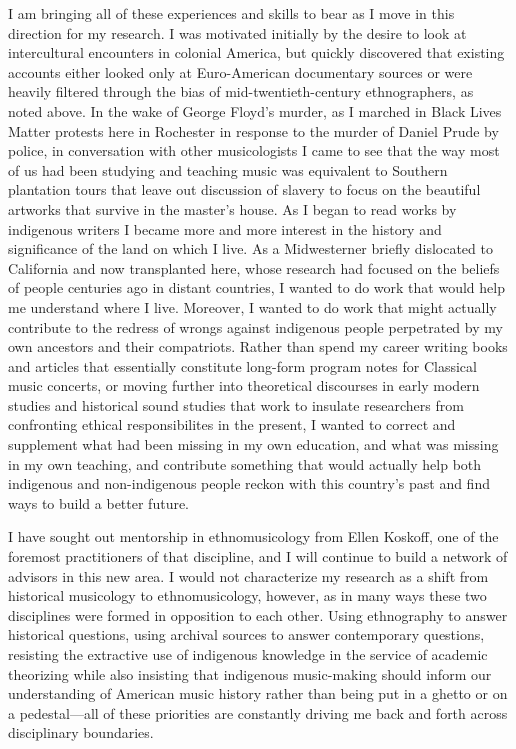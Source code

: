 \documentclass{neh}
\begin{document}
I am bringing all of these experiences and skills to bear as I move in this
direction for my research. 
I was motivated initially by the desire to look at intercultural encounters in
colonial America, but quickly discovered that existing accounts either looked
only at Euro-American documentary sources or were heavily filtered through the
bias of mid-twentieth-century ethnographers, as noted above.
In the wake of George Floyd's murder, as I marched in Black Lives Matter
protests here in Rochester in response to the murder of Daniel Prude by
police, in conversation with other musicologists I came to see that the way
most of us had been studying and teaching music was equivalent to Southern
plantation tours that leave out discussion of slavery to focus on the
beautiful artworks that survive in the master's house.
As I began to read works by indigenous writers I became more and more interest
in the history and significance of the land on which I live.
As a Midwesterner briefly dislocated to California and now transplanted here,
whose research had focused on the beliefs of people centuries ago in distant
countries, I wanted to do work that would help me understand where I live.
Moreover, I wanted to do work that might actually contribute to the redress of
wrongs against indigenous people perpetrated by my own ancestors and their
compatriots.
Rather than spend my career writing books and articles that essentially
constitute long-form program notes for Classical music concerts, or moving
further into theoretical discourses in early modern studies and historical
sound studies that work to insulate researchers from confronting ethical
responsibilites in the present, I wanted to correct and supplement what had
been missing in my own education, and what was missing in my own teaching, and
contribute something that would actually help both indigenous and
non-indigenous people reckon with this country's past and find ways to build a
better future.

I have sought out mentorship in ethnomusicology from Ellen Koskoff, one of the
foremost practitioners of that discipline, and I will continue to build a
network of advisors in this new area.
I would not characterize my research as a shift from historical musicology to
ethnomusicology, however, as in many ways these two disciplines were formed in
opposition to each other.
Using ethnography to answer historical questions, using archival sources to
answer contemporary questions, resisting the extractive use of indigenous
knowledge in the service of academic theorizing while also insisting that
indigenous music-making should inform our understanding of American music
history rather than being put in a ghetto or on a pedestal---all of these
priorities are constantly driving me back and forth across disciplinary
boundaries.
\end{document}
